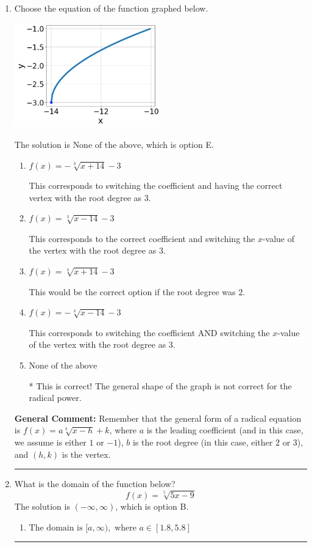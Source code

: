 \documentclass{extbook}[14pt]
\newcommand{\litem}[1]{\item #1

\rule{\textwidth}{0.4pt}}
\begin{document}
\begin{enumerate}\litem{
Choose the equation of the function graphed below.

\begin{center}
    \includegraphics[width=0.5\textwidth]{../Figures/radicalGraphToEquationCopyB.png}
\end{center}


The solution is \( \text{None of the above} \), which is option E.\begin{enumerate}[label=\Alph*.]
\item \( f(x) = - \sqrt[3]{x + 14} - 3 \)

This corresponds to switching the coefficient and having the correct vertex with the root degree as $3$.
\item \( f(x) = \sqrt[3]{x - 14} - 3 \)

This corresponds to the correct coefficient and switching the $x$-value of the vertex with the root degree as $3$.
\item \( f(x) = \sqrt[3]{x + 14} - 3 \)

This would be the correct option if the root degree was $2$.
\item \( f(x) = - \sqrt[3]{x - 14} - 3 \)

This corresponds to switching the coefficient AND switching the $x$-value of the vertex with the root degree as $3$.
\item \( \text{None of the above} \)

* This is correct! The general shape of the graph is not correct for the radical power.
\end{enumerate}

\textbf{General Comment:} Remember that the general form of a radical equation is $ f(x) = a \sqrt[b]{x - h} + k$, where $a$ is the leading coefficient (and in this case, we assume is either $1$ or $-1$), $b$ is the root degree (in this case, either $2$ or $3$), and $(h, k)$ is the vertex.
}
\litem{
What is the domain of the function below?
\[ f(x) = \sqrt[5]{5 x - 9} \]The solution is \( (-\infty, \infty) \), which is option B.\begin{enumerate}[label=\Alph*.]
\item \( \text{The domain is } [a, \infty), \text{   where } a \in [1.8, 5.8] \)


\end{enumerate}}
\end{enumerate}
\end{document}

